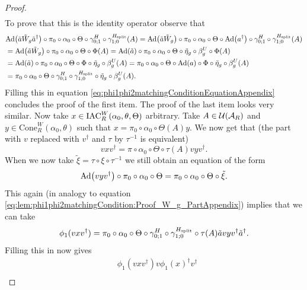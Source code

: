\documentclass[11pt,a4paper,twoside]{article}
\numberwithin{equation}{section}
\begin{document}
\begin{proof}
\begin{align}
		\end{align}
		To prove that this is the identity operator observe that
		\begin{align}
			\nonumber
			&\Ad{\tilde{a}\tilde{W}_g\tilde{a}^\dagger}\circ\pi_0\circ\alpha_0\circ\Theta\circ \gamma^{H}_{0;1}\circ\gamma^{\Hsplit}_{1;0}(A)=\Ad{\tilde{a}\tilde{W}_g}\circ\pi_0\circ\alpha_0\circ\Theta\circ\Ad{a^\dagger}\circ \gamma^{H}_{0;1}\circ\gamma^{\Hsplit}_{1;0}(A)\\
			&=\Ad{\tilde{a}\tilde{W}_g}\circ\pi_0\circ\alpha_0\circ\Theta\circ\Phi(A)=\Ad{\tilde{a}}\circ\pi_0\circ\alpha_0\circ\Theta\circ\tilde{\eta}_g\circ\beta_g^U\circ\Phi(A)\\
			\nonumber
			&=\Ad{\tilde{a}}\circ\pi_0\circ\alpha_0\circ\Theta\circ\Phi\circ\tilde{\eta}_g\circ\beta_g^U(A)=\pi_0\circ\alpha_0\circ\Theta\circ\Ad{a}\circ\Phi\circ\tilde{\eta}_g\circ\beta_g^U(A)\\
			\nonumber
			&=\pi_0\circ\alpha_0\circ\Theta\circ \gamma^{H}_{0;1}\circ\gamma^{\Hsplit}_{1;0} \circ\tilde{\eta}_g\circ\beta_g^U(A).
		\end{align}
		Filling this in equation \eqref{eq:phi1phi2matchingConditionEquationAppendix} concludes the proof of the first item. The proof of the last item looks very similar. Now take $x\in \textrm{IAC}_R^W(\alpha_0,\theta,\Theta)$ arbitrary. Take $A\in\mathcal U(\mathcal A_R)$ and $y\in\text{Cone}_R^W(\alpha_0,\theta)$ such that $x=\pi_0\circ\alpha_0\circ\Theta(A)y$. We now get that (the part with $v$ replaced with $v^\dagger$ and $\tau$ by $\tau^{-1}$ is equivalent)
		\begin{equation}
			vxv^\dagger=\pi\circ\alpha_0\circ\Theta\circ\tau(A)vyv^\dagger.
		\end{equation}
		When we now take $\tilde\xi=\tau\circ\xi\circ\tau^{-1}$ we still obtain an equation of the form
		\begin{equation}
			\Ad{vyv^\dagger}\circ \pi_0\circ\alpha_0\circ\Theta=\pi_0\circ\alpha_0\circ\Theta\circ\tilde\xi.
		\end{equation}
		This again (in analogy to equation \eqref{eq:lem:phi1phi2matchingCondition:Proof_W_g_PartAppendix}) implies that we can take
		\begin{equation}
			\phi_1(vxv^\dagger)=\pi_0\circ\alpha_0\circ\Theta\circ\gamma^{H}_{0;1}\circ\gamma^{{H_{\text{split}}}}_{1;0}\circ\tau(A)\tilde{a}vyv^\dagger\tilde{a}^\dagger.
		\end{equation}
		Filling this in now gives
		\begin{align}
			&\phi_1(vxv^\dagger)v\phi_1(x)^\dagger v^\dagger\\

\end{align}
\end{proof}
\end{document}
